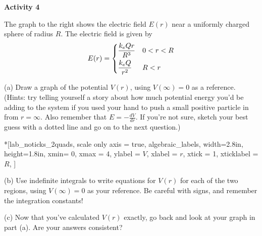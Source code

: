 \textbf{Activity 4} 

The graph to the right shows the electric field $E(r)$ near a uniformly charged sphere of radius $R$.  The electric field is given by
\begin{displaymath}
E(r) = \begin{dcases}
        \frac{k_eQr}{R^3}  &  0<r<R\\
        \frac{k_eQ}{r^2}  &  R<r
        \end{dcases}
\end{displaymath}





(a) Draw a graph of the potential $V(r)$, using $V(\infty)=0$ as a reference.  (Hints: try telling yourself a story about how much potential energy you'd be adding to the system if you used your hand to push a small positive particle in from $r=\infty$.  Also remember that $E = - \frac{dV}{dr}$.  If you're not sure, sketch your best guess with a dotted line and go on to the next question.)

\begin{lab_axis}*[lab_noticks_2quads,
	scale only axis = true,
	algebraic_labels,
	width={2.8in}, height={1.8in},
	xmin= 0, xmax = 4,
	ylabel = {$V$},
	xlabel = {$r$},
	xtick = {1},
	xticklabel = {$R$},
]
\end{lab_axis}

(b) Use indefinite integrals to write equations for $V(r)$ for each of the two regions, using $V(\infty)=0$ as your reference.  Be careful with signs, and remember the integration constants!
\answerspace{1.3in}

\vfill
(c) Now that you've calculated $V(r)$ exactly, go back and look at your graph in part (a).  Are your answers consistent?
